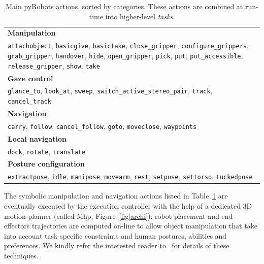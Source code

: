 \documentclass[preprint,3p,times]{elsarticle}
\begin{document}
\begin{table}[ht!]
\begin{center}
\begin{tabular}{p{}}
\hline
    {\bf Manipulation} \\
     {\tt attachobject}, {\tt basicgive}, {\tt basictake}, {\tt close\_gripper}, {\tt configure\_grippers}, {\tt grab\_gripper}, {\tt handover}, {\tt hide}, {\tt open\_gripper}, {\tt pick}, {\tt put}, {\tt put\_accessible}, {\tt release\_gripper}, {\tt show}, {\tt take} \\
\hline
    {\bf Gaze control} \\
     {\tt glance\_to}, {\tt look\_at}, {\tt sweep}, {\tt switch\_active\_stereo\_pair}, {\tt track}, {\tt cancel\_track} \\
\hline
    {\bf Navigation} \\
     {\tt carry}, {\tt follow}, {\tt cancel\_follow}, {\tt goto}, {\tt moveclose}, {\tt waypoints} \\
\hline
    {\bf Local navigation} \\
     {\tt dock}, {\tt rotate}, {\tt translate} \\
\hline
    {\bf Posture configuration} \\
     {\tt extractpose}, {\tt idle}, {\tt manipose}, {\tt movearm}, {\tt rest}, {\tt setpose}, {\tt settorso}, {\tt tuckedpose} \\
\hline
\end{tabular}
\end{center}
\caption{Main {\sc pyRobots} actions, sorted by categories. These
actions are combined at run-time into higher-level \emph{tasks}.}

\label{table|pyrobots_actions}
\end{table}

The symbolic manipulation and navigation actions listed in
Table~\ref{table|pyrobots_actions} are eventually executed by the execution
controller with the help of a dedicated 3D motion planner (called {\sc Mhp},
Figure~\ref{fig|archi}): robot placement and end-effectors trajectories are
computed on-line to allow object manipulation that take into account task
specific constraints and human postures, abilities and preferences.  We kindly
refer the interested reader to~\cite{Sisbot2008, Mainprice2011, Pandey2011} for
details of these techniques.
\end{document}
